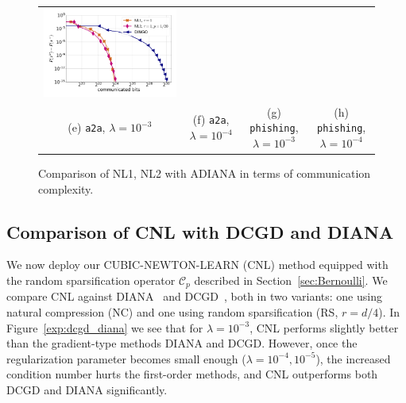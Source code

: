\documentclass[10pt]{article}
\newcommand{\cC}{{\mathcal{C}}}
\begin{document}
\begin{figure}[ht]
\begin{center}
{\begin{tabular}{cccc}
				\includegraphics[width = 0.23 \textwidth]{LogReg/phishing/Lambda=1e-4/phishing_nl1_nl2_dingo_lmb=0.0001.pdf}
				\\
				(e) {\tt a2a}, $\lambda=10^{-3}$ &(f) {\tt a2a}, $\lambda=10^{-4}$ & (g) {\tt phishing}, $\lambda=10^{-3}$ &(h) {\tt phishing}, $\lambda=10^{-4}$
		\end{tabular}}
		\caption{Comparison of {\sf NL1}, {\sf NL2} with ADIANA in terms of communication complexity.}
		\label{exp:dingo}
	\end{center}
\end{figure}




\subsection{Comparison of {\sf CNL} with  DCGD and DIANA}

We now deploy our {\sf CUBIC-NEWTON-LEARN (CNL)} method equipped with the random sparsification operator $\cC_p$ described in Section~\ref{sec:Bernoulli}. We compare {\sf CNL} against DIANA~\citep{DIANA} and DCGD~\citep{KFJ}, both in two variants: one using natural compression (NC) and one using random sparsification (RS, $r=d/4$). In Figure~\ref{exp:dcgd_diana} we see that for $\lambda=10^{-3}$, {\sf CNL} performs slightly better than the gradient-type methods DIANA and DCGD. However, once the regularization parameter becomes small enough ($\lambda=10^{-4}, 10^{-5}$), the increased condition number hurts the first-order methods, and {\sf CNL} outperforms both DCGD and DIANA significantly.
\end{document}
